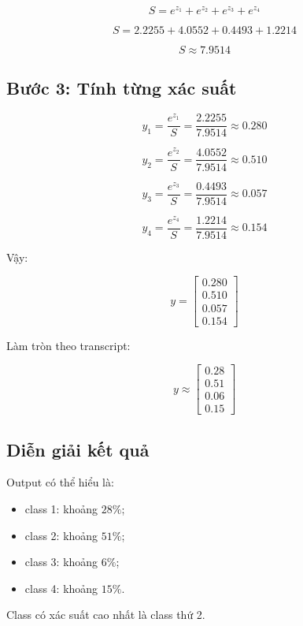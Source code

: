 \[
    S =
    e^{z_1}+e^{z_2}+e^{z_3}+e^{z_4}
\]

\[
    S =
    2.2255+4.0552+0.4493+1.2214
\]

\[
    S \approx 7.9514
\]

\subsection{Bước 3: Tính từng xác suất}

\[
    y_1 =
    \frac{e^{z_1}}{S}
    =
    \frac{2.2255}{7.9514}
    \approx 0.280
\]

\[
    y_2 =
    \frac{e^{z_2}}{S}
    =
    \frac{4.0552}{7.9514}
    \approx 0.510
\]

\[
    y_3 =
    \frac{e^{z_3}}{S}
    =
    \frac{0.4493}{7.9514}
    \approx 0.057
\]

\[
    y_4 =
    \frac{e^{z_4}}{S}
    =
    \frac{1.2214}{7.9514}
    \approx 0.154
\]

Vậy:

\[
    y =
    \begin{bmatrix}
    0.280\\
    0.510\\
    0.057\\
    0.154
    \end{bmatrix}
\]

Làm tròn theo transcript:

\[
    y \approx
    \begin{bmatrix}
    0.28\\
    0.51\\
    0.06\\
    0.15
    \end{bmatrix}
\]

\subsection{Diễn giải kết quả}

Output có thể hiểu là:

\begin{itemize}
    \item class 1: khoảng $28\%$;
    \item class 2: khoảng $51\%$;
    \item class 3: khoảng $6\%$;
    \item class 4: khoảng $15\%$.
\end{itemize}

Class có xác suất cao nhất là class thứ 2.

